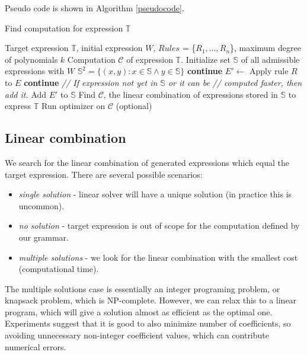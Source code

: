 Pseudo code is shown in Algorithm \ref{pseudocode}.

\begin{algorithm}[t]
\caption{Find computation for expression $\mathbb{T}$}
\begin{algorithmic} 
\REQUIRE Target expression $\mathbb{T}$, initial expression $W$, $Rules$ = \{$R_1, \dots, R_n$\}, maximum degree of polynomials $k$
\ENSURE Computation $\mathcal{C}$ of expression $\mathbb{T}$.
\STATE Initialize set $\mathbb{S}$ of all admissible expressions with $W$
\STATE $\mathbb{S}^2 = \{ (x, y) : x \in \mathbb{S} \land y \in \mathbb{S}\}$ 
\STATE \textbf{continue}
\ENDIF
\STATE $E' \gets$ Apply rule $R$ to $E$
  \STATE \textbf{continue}
\ENDIF
\STATE \emph{// If expression not yet in $\mathbb{S}$ or it can be}
\STATE \emph{// computed faster, then add it.}
  \STATE Add $E'$ to $\mathbb{S}$
\ENDIF
\ENDFOR
\ENDFOR
\ENDWHILE
\STATE Find $\mathcal{C}$, the linear combination of expressions stored in $\mathbb{S}$ to express $\mathbb{T}$
\STATE Run optimizer on $\mathcal{C}$ (optional)
\end{algorithmic}
\label{pseudocode}
\end{algorithm}


\subsection{Linear combination}
\label{sec:linear}

We search for the linear combination of generated expressions which equal the target expression. 
There are several possible scenarios:
\begin{itemize}
  \item \emph{single solution} - linear solver will have a unique solution (in practice
 this is uncommon).
 \item \emph{no solution} - target expression is out of scope for the computation defined by
our grammar. 
 \item  \emph{multiple solutions} - we look for the linear combination with the smallest cost
(computational time). 
\end{itemize}
The multiple solutions case is essentially an integer programing
problem, or knapsack problem, which is NP-complete. However, we can
relax this to a linear program, which will give a solution almost as
efficient as the optimal one. Experiments suggest that it is good to
also minimize number of coefficients, so avoiding unnecessary
non-integer coefficient values, which can contribute numerical errors.


